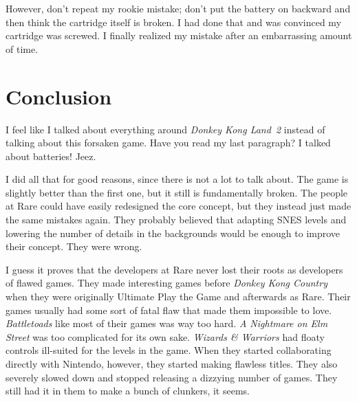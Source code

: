 \documentclass{book}
\begin{document}
\FloatBarrier\vspace{\baselineskip}\begin{figure}[H]\end{figure}
However, don’t repeat my rookie mistake; don’t put the battery on backward and then think the cartridge itself is broken. I had done that and was convinced my cartridge was screwed. I finally realized my mistake after an embarrassing amount of time.\par
\FloatBarrier\section*{Conclusion}
I feel like I talked about everything around \emph{Donkey Kong Land~2} instead of talking about this forsaken game. Have you read my last paragraph? I talked about batteries! Jeez.\par
I did all that for good reasons, since there is not a lot to talk about. The game is slightly better than the first one, but it still is fundamentally broken. The people at Rare could have easily redesigned the core concept, but they instead just made the same mistakes again. They probably believed that adapting SNES levels and lowering the number of details in the backgrounds would be enough to improve their concept. They were wrong.\par
I guess it proves that the developers at Rare never lost their roots as developers of flawed games. They made interesting games before \emph{Donkey Kong Country} when they were originally Ultimate Play the Game and afterwards as Rare. Their games usually had some sort of fatal flaw that made them impossible to love. \emph{Battletoads} like most of their games was way too hard. \emph{A Nightmare on Elm Street} was too complicated for its own sake. \emph{Wizards \& Warriors} had floaty controls ill-suited for the levels in the game. When they started collaborating directly with Nintendo, however, they started making flawless titles. They also severely slowed down and stopped releasing a dizzying number of games. They still had it in them to make a bunch of clunkers, it seems.\par
\end{document}
